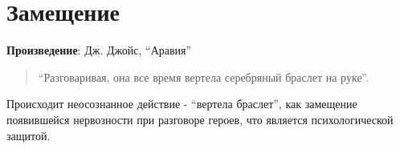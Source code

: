 \section{Замещение}

\textbf{Произведение}: Дж. Джойс, “Аравия”

\begin{quote}
    “Разговаривая, она все время вертела серебряный браслет на руке”.
\end{quote}

Происходит  неосознанное действие - “вертела браслет”, как замещение появившейся нервозности при разговоре героев, что является психологической защитой. 
